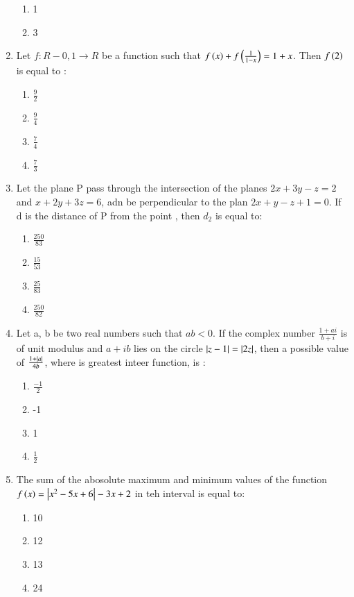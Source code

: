 \documentclass[journal]{IEEEtran}
\begin{document}
\begin{enumerate}
\begin{enumerate}
			\item 1
			\item 3
        	\end{enumerate}
	\item Let $f:R-{0,1} \rightarrow R$ be a function such that $f\left(x\right)+f\left(\frac{1}{1-x}\right)=1+x$. Then $f\left(2\right)$ is equal to :
		\begin{enumerate}
			\item $\frac{9}{2}$
                        \item $\frac{9}{4}$
                        \item $\frac{7}{4}$
                        \item $\frac{7}{3}$
        	\end{enumerate}	
	\item  Let the plane P pass through the intersection of the planes $2x+3y-z=2$ and $x+2y+3z=6$, adn be perpendicular to the plan $2x+y-z+1=0$. If d is the distance of P from the point , then $d_2$ is equal to:
		\begin{enumerate}
			\item $\frac{250}{83}$
			\item $\frac{15}{53}$
			\item $\frac{25}{83}$
			\item $\frac{250}{82}$
        	\end{enumerate}	
	\item Let a, b be two real numbers such that $ab<0$. If the complex number $\frac{1+ai}{b+i}$ is of unit modulus and $a+ib $ lies on the circle $\left\vert z-1\right\vert=\left\vert2z\right\vert$, then a possible value of $\frac{1+\left\vert a\right\vert}{4b}$, where  is greatest inteer function, is : 
                \begin{enumerate}
			\item $\frac{-1}{2}$
			\item -1
			\item 1
			\item $\frac{1}{2}$
        	\end{enumerate}		
	\item The sum of the abosolute maximum and minimum values of the function $f\left(x\right) =\left\vert x^2-5x+6\right\vert-3x+2$ in teh interval  is equal to:
		\begin{enumerate}
			\item 10
			\item 12
			\item 13
			\item 24
        	\end{enumerate}	

\end{enumerate}
\end{document}
